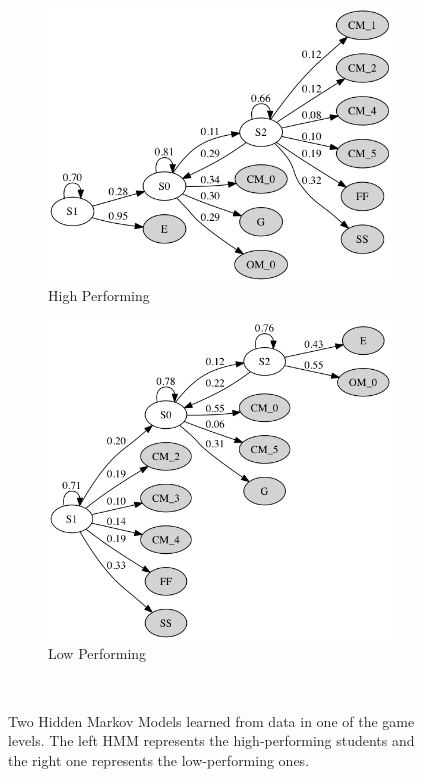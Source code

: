 \documentclass{sigchi}
\begin{document}
\begin{figure}[t]
	\centering
	\begin{subfigure}{.5\textwidth}
		\centering
		\includegraphics[width=0.9\columnwidth]{figures/high.png}
		\caption{High Performing~\label{fig:highhmm}}
	\end{subfigure}\begin{subfigure}{.5\textwidth}
		\centering
		\includegraphics[width=0.9\columnwidth]{figures/low.png}
		\caption{Low Performing~\label{fig:lowhmm}}
	\end{subfigure}
	\caption{Two Hidden Markov Models learned from data in one of the game levels. The left HMM represents the high-performing students and the right one represents the low-performing ones.}~\label{fig:highvslow}
\end{figure}
\end{document}
